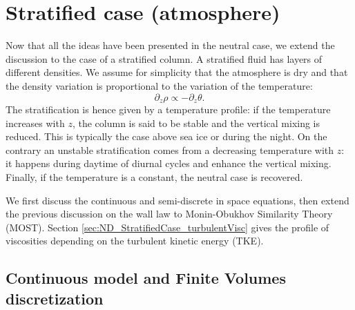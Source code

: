 \section{Stratified case (atmosphere)}
Now that all the ideas have been presented in the neutral case,
we extend the discussion to the case of a stratified column.
A stratified fluid has layers of different densities.
We assume for simplicity that the atmosphere
is dry and that the density variation is
proportional to the variation of the temperature:
\begin{equation}
	\partial_z \rho \propto
	- \partial_z \theta.
\end{equation}
The stratification is hence given by a temperature profile:
if the temperature increases with $z$, the column is said
to be stable and the vertical mixing is reduced. This is
typically the case above sea ice or during the night.
On the contrary an unstable stratification comes from
a decreasing temperature with $z$: it happens
during daytime of diurnal cycles and enhance the
vertical mixing.
%
Finally, if the temperature is a constant, the neutral case is
recovered.
\par
We first discuss the continuous and semi-discrete in space
equations, then extend the previous discussion on the wall law to
Monin-Obukhov Similarity Theory (MOST).
Section \ref{sec:ND_StratifiedCase_turbulentVisc} gives the
profile of viscosities depending on the turbulent kinetic energy
(TKE).
\subsection{Continuous model and Finite Volumes discretization}

